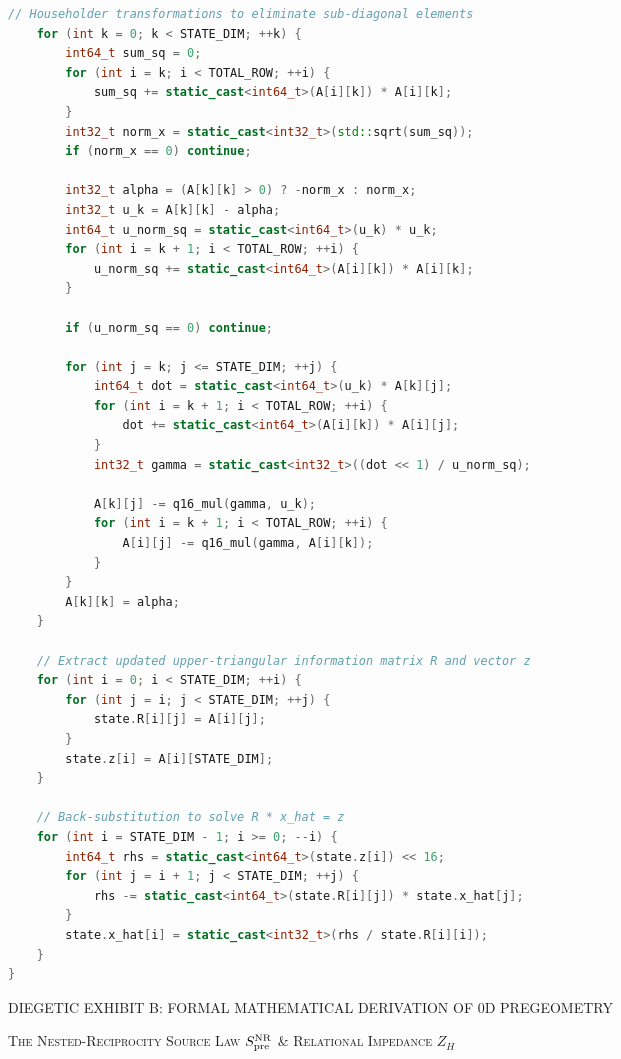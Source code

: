 \documentclass[12pt,twoside,openright]{book}
\newcommand{\sceneheader}[1]{%
  \par\vspace{1.8em}%
  {\noindent\centering\scshape\large #1\par}%
  \vspace{1.0em}%
  \noindent%
}
\newcommand{\dinkus}{%
  \par\vspace{1.2em}%
  {\noindent\centering{\large $\ast\quad\ast\quad\ast$}\par}%
  \vspace{1.2em}%
  \noindent%
}
\begin{document}
\begin{lstlisting}[language={C++}]
    // Householder transformations to eliminate sub-diagonal elements
    for (int k = 0; k < STATE_DIM; ++k) {
        int64_t sum_sq = 0;
        for (int i = k; i < TOTAL_ROW; ++i) {
            sum_sq += static_cast<int64_t>(A[i][k]) * A[i][k];
        }
        int32_t norm_x = static_cast<int32_t>(std::sqrt(sum_sq));
        if (norm_x == 0) continue;

        int32_t alpha = (A[k][k] > 0) ? -norm_x : norm_x;
        int32_t u_k = A[k][k] - alpha;
        int64_t u_norm_sq = static_cast<int64_t>(u_k) * u_k;
        for (int i = k + 1; i < TOTAL_ROW; ++i) {
            u_norm_sq += static_cast<int64_t>(A[i][k]) * A[i][k];
        }

        if (u_norm_sq == 0) continue;

        for (int j = k; j <= STATE_DIM; ++j) {
            int64_t dot = static_cast<int64_t>(u_k) * A[k][j];
            for (int i = k + 1; i < TOTAL_ROW; ++i) {
                dot += static_cast<int64_t>(A[i][k]) * A[i][j];
            }
            int32_t gamma = static_cast<int32_t>((dot << 1) / u_norm_sq);

            A[k][j] -= q16_mul(gamma, u_k);
            for (int i = k + 1; i < TOTAL_ROW; ++i) {
                A[i][j] -= q16_mul(gamma, A[i][k]);
            }
        }
        A[k][k] = alpha;
    }

    // Extract updated upper-triangular information matrix R and vector z
    for (int i = 0; i < STATE_DIM; ++i) {
        for (int j = i; j < STATE_DIM; ++j) {
            state.R[i][j] = A[i][j];
        }
        state.z[i] = A[i][STATE_DIM];
    }

    // Back-substitution to solve R * x_hat = z
    for (int i = STATE_DIM - 1; i >= 0; --i) {
        int64_t rhs = static_cast<int64_t>(state.z[i]) << 16;
        for (int j = i + 1; j < STATE_DIM; ++j) {
            rhs -= static_cast<int64_t>(state.R[i][j]) * state.x_hat[j];
        }
        state.x_hat[i] = static_cast<int32_t>(rhs / state.R[i][i]);
    }
}
\end{lstlisting}

\dinkus

\sceneheader{DIEGETIC EXHIBIT B: FORMAL MATHEMATICAL DERIVATION OF 0D
PREGEOMETRY}

\sceneheader{\texorpdfstring{The Nested-Reciprocity Source Law
\(S_{\rm pre}^{\rm NR}\) \& Relational Impedance
\(Z_H\)}{The Nested-Reciprocity Source Law S\_\{\textbackslash rm pre\}\^{}\{\textbackslash rm NR\} \& Relational Impedance Z\_H}}\label{the-nested-reciprocity-source-law-s_rm-prerm-nr-relational-impedance-z_h}
\end{document}

